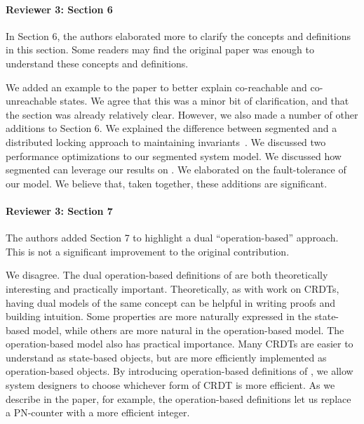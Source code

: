 \documentclass[9pt]{article}
\begin{document}
\begin{multicols*}{2}
\paragraph{Reviewer 3: Section 6}
\begin{feedback}
  In Section 6, the authors elaborated more to clarify the concepts and
  definitions in this section. Some readers may find the original paper was
  enough to understand these concepts and definitions.
\end{feedback}
We added an example to the paper to better explain co-reachable and
co-unreachable states.  We agree that this was a minor bit of clarification,
and that the section was already relatively clear. However, we also made a
number of other additions to Section 6. We explained the difference between
segmented \invariantconfluence{} and a distributed locking approach to
maintaining invariants~\cite{balegas2015putting, gotsman2016cause}. We
discussed two performance optimizations to our segmented \invariantconfluence{}
system model.  We discussed how segmented \invariantconfluence{} can leverage
our results on \mergereducibility{}. We elaborated on the fault-tolerance of
our model. We believe that, taken together, these additions are significant.

\paragraph{Reviewer 3: Section 7}
\begin{feedback}
  The authors added Section 7 to highlight a dual ``operation-based'' approach.
  This is not a significant improvement to the original contribution.
\end{feedback}
We disagree. The dual operation-based definitions of \invariantconfluence{} are
both theoretically interesting and practically important. Theoretically, as
with work on CRDTs, having dual models of the same concept can be helpful in
writing proofs and building intuition. Some properties are more naturally
expressed in the state-based model, while others are more natural in the
operation-based model. The operation-based model also has practical importance.
Many CRDTs are easier to understand as state-based objects, but are more
efficiently implemented as operation-based objects. By introducing
operation-based definitions of \invariantconfluence{}, we allow system
designers to choose whichever form of CRDT is more efficient. As we describe in
the paper, for example, the operation-based definitions let us replace a
PN-counter with a more efficient integer.


\end{multicols*}
\end{document}
